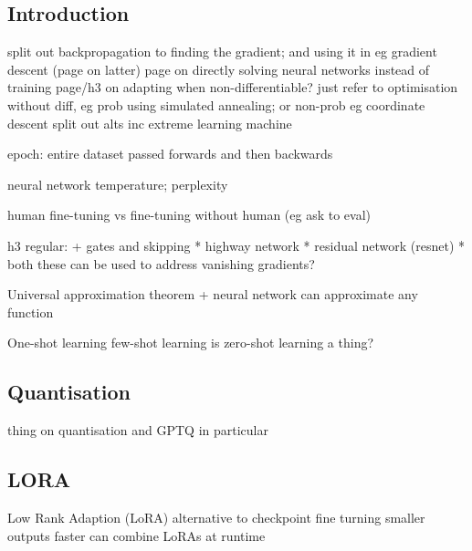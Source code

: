 
\subsection{Introduction}

split out backpropagation to finding the gradient; and using it in eg gradient descent (page on latter)
page on directly solving neural networks instead of training
page/h3 on adapting when non-differentiable? just refer to optimisation without diff, eg prob using simulated annealing; or non-prob eg coordinate descent
split out alts inc extreme learning machine

epoch: entire dataset passed forwards and then backwards

neural network temperature; perplexity

human fine-tuning vs fine-tuning without human (eg ask to eval)

h3 regular:
+ gates and skipping
  * highway network
  * residual network (resnet)
  * both these can be used to address vanishing gradients?

Universal approximation theorem
+ neural network can approximate any function

One-shot learning
few-shot learning
is zero-shot learning a thing?

\subsection{Quantisation}


thing on quantisation and GPTQ in particular

\subsection{LORA}

Low Rank Adaption (LoRA)
alternative to checkpoint fine turning
smaller outputs
faster
can combine LoRAs at runtime




